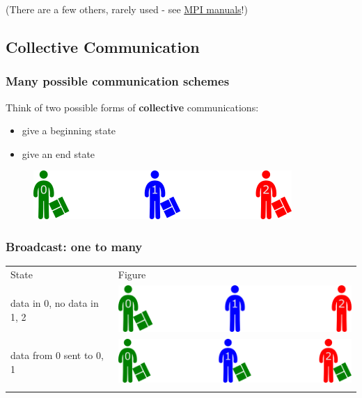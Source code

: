 (There are a few others, rarely used - see
\href{https://www.open-mpi.org/doc/v3.0/}{MPI manuals}!)

\subsection{Collective Communication}\label{collective-communication}

\subsubsection{Many possible communication
schemes}\label{many-possible-communication-schemes}

Think of two possible forms of \textbf{collective} communications:

\begin{itemize}
\itemsep1pt\parskip0pt
\item
  give a beginning state
\item
  give an end state
\end{itemize}

\begin{figure}[htbp]
\centering
\includegraphics{06MPI/figures/collective.png}
\end{figure}

\subsubsection{Broadcast: one to many}\label{broadcast-one-to-many}

\begin{longtable}[c]{@{}ll@{}}
\toprule\addlinespace
State & Figure
\\\addlinespace
\midrule\endhead
data in 0, no data in 1, 2 &
\includegraphics{06MPI/figures/broadcast0.png}
\\\addlinespace
data from 0 sent to 0, 1 &
\includegraphics{06MPI/figures/broadcast1.png}
\\\addlinespace
\bottomrule
\end{longtable}

